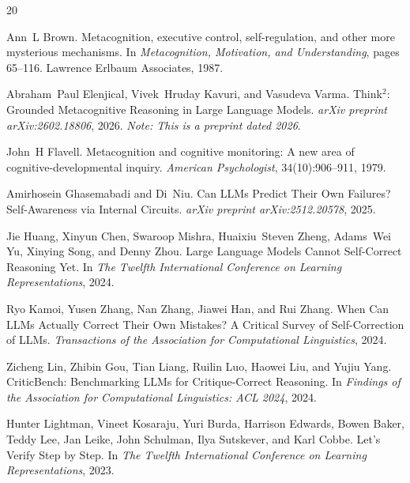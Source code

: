 \documentclass{article}
\begin{document}

\begin{thebibliography}{20}

Ann~L Brown.
\newblock Metacognition, executive control, self-regulation, and other more mysterious mechanisms.
\newblock In \emph{Metacognition, Motivation, and Understanding}, pages 65--116. Lawrence Erlbaum Associates, 1987.

Abraham~Paul Elenjical, Vivek~Hruday Kavuri, and Vasudeva Varma.
\newblock Think$^2$: Grounded Metacognitive Reasoning in Large Language Models.
\newblock \emph{arXiv preprint arXiv:2602.18806}, 2026.
\newblock \textit{Note: This is a preprint dated 2026}.

John~H Flavell.
\newblock Metacognition and cognitive monitoring: A new area of cognitive-developmental inquiry.
\newblock \emph{American Psychologist}, 34(10):906--911, 1979.

Amirhosein Ghasemabadi and Di~Niu.
\newblock Can {LLMs} Predict Their Own Failures? Self-Awareness via Internal Circuits.
\newblock \emph{arXiv preprint arXiv:2512.20578}, 2025.

Jie Huang, Xinyun Chen, Swaroop Mishra, Huaixiu~Steven Zheng, Adams~Wei Yu, Xinying Song, and Denny Zhou.
\newblock Large Language Models Cannot Self-Correct Reasoning Yet.
\newblock In \emph{The Twelfth International Conference on Learning Representations}, 2024.

Ryo Kamoi, Yusen Zhang, Nan Zhang, Jiawei Han, and Rui Zhang.
\newblock When Can {LLMs} Actually Correct Their Own Mistakes? A Critical Survey of Self-Correction of {LLMs}.
\newblock \emph{Transactions of the Association for Computational Linguistics}, 2024.

Zicheng Lin, Zhibin Gou, Tian Liang, Ruilin Luo, Haowei Liu, and Yujiu Yang.
\newblock CriticBench: Benchmarking {LLMs} for Critique-Correct Reasoning.
\newblock In \emph{Findings of the Association for Computational Linguistics: ACL 2024}, 2024.

Hunter Lightman, Vineet Kosaraju, Yuri Burda, Harrison Edwards, Bowen Baker, Teddy Lee, Jan Leike, John Schulman, Ilya Sutskever, and Karl Cobbe.
\newblock Let's Verify Step by Step.
\newblock In \emph{The Twelfth International Conference on Learning Representations}, 2023.


\end{thebibliography}
\end{document}
